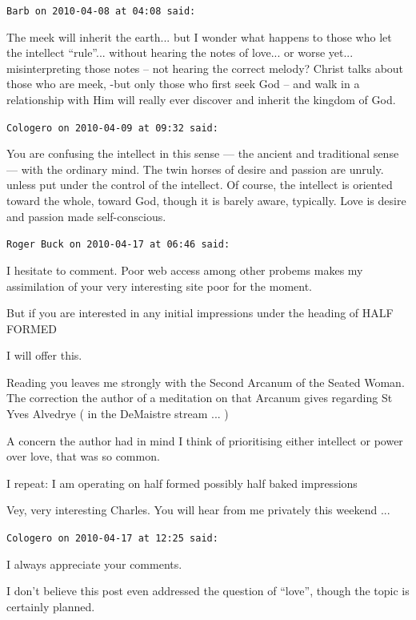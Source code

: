 \begin{footnotesize}
\begin{sffamily}
\texttt{Barb on 2010-04-08 at 04:08 said:}

The meek will inherit the earth... but I wonder what happens to those who let the intellect ``rule''... without hearing the notes of love... or worse yet... misinterpreting those notes -- not hearing the correct melody? Christ talks about those who are meek, -but only those who first seek God -- and walk in a relationship with Him will really ever discover and inherit the kingdom of God.

\hfill

\texttt{Cologero on 2010-04-09 at 09:32 said:}

You are confusing the intellect in this sense --- the ancient and traditional sense --- with the ordinary mind. The twin horses of desire and passion are unruly. unless put under the control of the intellect. Of course, the intellect is oriented toward the whole, toward God, though it is barely aware, typically. Love is desire and passion made self-conscious.

\hfill

\texttt{Roger Buck on 2010-04-17 at 06:46 said:}

I hesitate to comment. Poor web access among other probems makes my assimilation of your very interesting site poor for the moment.

But if you are interested in any initial impressions under the heading of HALF FORMED

I will offer this.

Reading you leaves me strongly with the Second Arcanum of the Seated Woman. The correction the author of a meditation on that Arcanum gives regarding St Yves Alvedrye ( in the DeMaistre stream ... )

A concern the author had in mind I think of prioritising either intellect or power over love, that was so common.

I repeat: I am operating on half formed possibly half baked impressions

Vey, very interesting Charles. You will hear from me privately this weekend ... 

\hfill

\texttt{Cologero on 2010-04-17 at 12:25 said:}

I always appreciate your comments.

I don't believe this post even addressed the question of ``love'', though the topic is certainly planned.


\end{sffamily}
\end{footnotesize}
